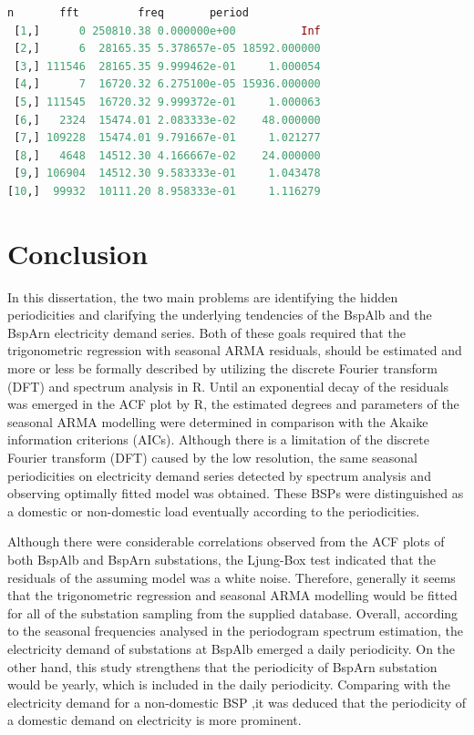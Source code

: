 \documentclass[12pt,msc]{uom_eee_dissertation_casson}
\begin{document}
\begin{lstlisting}[language=R,breaklines=true]
           n       fft         freq       period
 [1,]      0 250810.38 0.000000e+00          Inf
 [2,]      6  28165.35 5.378657e-05 18592.000000
 [3,] 111546  28165.35 9.999462e-01     1.000054
 [4,]      7  16720.32 6.275100e-05 15936.000000
 [5,] 111545  16720.32 9.999372e-01     1.000063
 [6,]   2324  15474.01 2.083333e-02    48.000000
 [7,] 109228  15474.01 9.791667e-01     1.021277
 [8,]   4648  14512.30 4.166667e-02    24.000000
 [9,] 106904  14512.30 9.583333e-01     1.043478
[10,]  99932  10111.20 8.958333e-01     1.116279
\end{lstlisting}
\chapter{Conclusion}%
\label{chap:conclusion}
In this dissertation, the two main problems are identifying the hidden periodicities and clarifying the underlying tendencies of the BspAlb and the BspArn electricity demand series. Both of these goals required that the trigonometric regression with seasonal ARMA residuals, should be estimated and more or less be formally described by utilizing the discrete Fourier transform (DFT) and spectrum analysis in R. Until an exponential decay of the residuals was emerged in the ACF plot by R, the estimated degrees and parameters of the seasonal ARMA modelling were determined in comparison with the Akaike information criterions (AICs). Although there is a limitation of the discrete Fourier transform (DFT) caused by the low resolution, the same seasonal periodicities on electricity demand series detected by spectrum analysis and observing optimally fitted model was obtained. These BSPs were distinguished as a domestic or non-domestic load eventually according to the periodicities.

Although there were considerable correlations observed from the ACF plots of both BspAlb and BspArn substations, the Ljung-Box test indicated that the residuals of the assuming model was a white noise. Therefore, generally it seems that the trigonometric regression and seasonal ARMA modelling would be fitted for all of the substation sampling from the supplied database. Overall, according to the seasonal frequencies analysed in the periodogram spectrum estimation, the electricity demand of substations at BspAlb emerged a daily periodicity. On the other hand, this study strengthens that the periodicity of BspArn substation would be yearly, which is included in the daily periodicity. Comparing with the electricity demand for a non-domestic BSP ,it was deduced that the periodicity of a domestic demand on electricity is more prominent.
\end{document}

